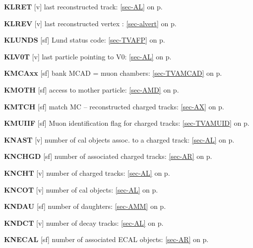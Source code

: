  \item{\bf KLRET   }[v] last reconstructed track: \ref{sec-AL} on p.~\pageref{sec-AL}\\
 \item{\bf KLREV   }[v] last reconstructed vertex  : \ref{sec-alvert} on p.~\pageref{sec-alvert}\\
 \item{\bf KLUNDS  }[sf] Lund status code: \ref{sec-TVAFP} on p.~\pageref{sec-TVAFP}\\
 \item{\bf KLV0T   }[v] last particle pointing to V0: \ref{sec-AL} on p.~\pageref{sec-AL}\\
 \item{\bf KMCAxx  }[sf] bank MCAD = muon chambers: \ref{sec-TVAMCAD} on p.~\pageref{sec-TVAMCAD}\\
 \item{\bf KMOTH   }[sf] access to mother particle: \ref{sec-AMD} on p.~\pageref{sec-AMD}\\
 \item{\bf KMTCH   }[sf] match MC -- reconstructed charged tracks: \ref{sec-AX} on p.~\pageref{sec-AX}\\
 \item{\bf KMUIIF  }[sf] Muon identification flag for charged tracks:
                    \ref{sec-TVAMUID} on p.~\pageref{sec-TVAMUID}\\
 \item{\bf KNAST   }[v] number of cal objects assoc. to a charged
 track:
 \ref{sec-AL} on p.~\pageref{sec-AL}\\
 \item{\bf KNCHGD  }[sf] number of associated charged tracks: \ref{sec-AR} on p.~\pageref{sec-AR}\\
 \item{\bf KNCHT   }[v] number of charged tracks: \ref{sec-AL} on p.~\pageref{sec-AL}\\
 \item{\bf KNCOT   }[v] number of cal objects: \ref{sec-AL} on p.~\pageref{sec-AL}\\
 \item{\bf KNDAU   }[sf] number of daughters: \ref{sec-AMM} on p.~\pageref{sec-AMM}\\
 \item{\bf KNDCT   }[v] number of decay tracks: \ref{sec-AL} on p.~\pageref{sec-AL}\\
 \item{\bf KNECAL  }[sf] number of associated ECAL objects: \ref{sec-AR} on p.~\pageref{sec-AR}\\
